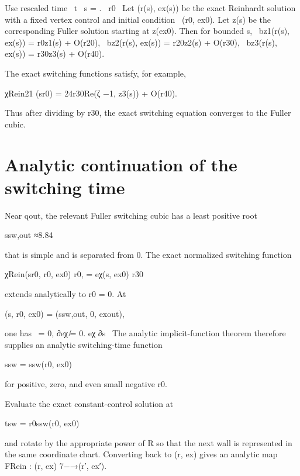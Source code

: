 \begin{displaytext}
Use rescaled time \
t \
s = . \
r0 \
Let (r(s), ex(s)) be the exact Reinhardt solution with a fixed vertex control and initial condition \
(r0, ex0). Let z(s) be the corresponding Fuller solution starting at z(ex0). Then for bounded s, \
bz1(r(s), ex(s)) = r0z1(s) + O(r20), \
bz2(r(s), ex(s)) = r20z2(s) + O(r30), \
bz3(r(s), ex(s)) = r30z3(s) + O(r40).
\end{displaytext}

The exact switching functions satisfy, for example,


\begin{displaytext}
χRein21 (sr0) = 24r30Re(ζ −1, z3(s)) + O(r40).
\end{displaytext}

Thus after dividing by r30, the exact switching equation converges to the Fuller cubic.


\section{Analytic continuation of the switching time}

Near qout, the relevant Fuller switching cubic has a least positive root


ssw,out ≈8.84


that is simple and is separated from 0. The exact normalized switching function


\begin{displaytext}
χRein(sr0, r0, ex0) r0, = eχ(s, ex0) r30
\end{displaytext}

extends analytically to r0 = 0. At


(s, r0, ex0) = (ssw,out, 0, exout),


\begin{displaytext}
one has \
= 0, ∂eχ ̸= 0. eχ ∂s \
The analytic implicit-function theorem therefore supplies an analytic switching-time function
\end{displaytext}

ssw = ssw(r0, ex0)


for positive, zero, and even small negative r0.


Evaluate the exact constant-control solution at


tsw = r0ssw(r0, ex0)


and rotate by the appropriate power of R so that the next wall is represented in the same coordinate chart. Converting back to (r, ex) gives an analytic map FRein : (r, ex) 7−→(r′, ex′).


